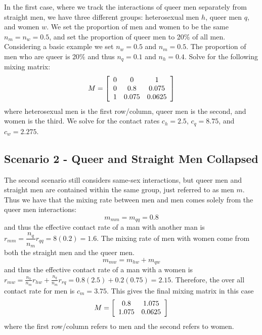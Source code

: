 \documentclass[12pt]{article}
\begin{document}
In the first case, where we track the interactions of queer men separately from straight men, we have three different groups: heterosexual men $h$, queer men $q$, and women $w$.  We set the proportion of men and women to be the same $n_m=n_w=0.5$, and set the proportion of queer men to 20\% of all men.  Considering a basic example we set $n_w=0.5$ and $n_m=0.5$.  The proportion of men who are queer is 20\% and thus $n_q=0.1$ and $n_h=0.4$.  Solve for the following mixing matrix:
\begin{equation}
M = \left[\begin{array}{c c c}
0 & 0 & 1 \\
0 & 0.8 & 0.075 \\
1 & 0.075 & 0.0625 
\end{array}\right]
\end{equation}
where heterosexual men is the first row/column, queer men is the second, and women is the third.  We solve for the contact rates $c_h=2.5$, $c_q=8.75$, and $c_w=2.275$.  

\subsection{Scenario 2 - Queer and Straight Men Collapsed}
The second scenario still considers same-sex interactions, but queer men and straight men are contained within the same group, just referred to as men $m$.  Thus we have that the mixing rate between men and men comes solely from the queer men interactions:
\begin{equation}
m_{mm} = m_{qq} = 0.8
\end{equation}
and thus the effective contact rate of a man with another man is $r_{mm} = \dfrac{n_q}{n_m} r_{qq} = 8(0.2) = 1.6$.  The mixing rate of men with women come from both the straight men and the queer men. 
\begin{equation}
m_{mw} = m_{hw} + m_{qw}
\end{equation}
and thus the effective contact rate of a man with a women is $r_{mw} = \frac{n_h}{n_m}r_{hw} + \frac{n_q}{n_m}r_{rq} = 0.8(2.5)+0.2(0.75) = 2.15$.  Therefore, the over all contact rate for men is $c_m=3.75$.  This gives the final mixing matrix in this case
\begin{equation}
M = \left[\begin{array}{c c}
0.8 & 1.075 \\
1.075 & 0.0625 
\end{array}\right]
\end{equation}
where the first row/column refers to men and the second refers to women.  
\end{document}
